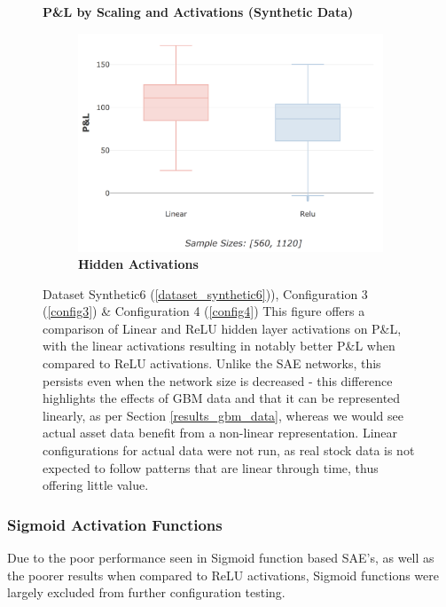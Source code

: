 \documentclass[a4paper,11pt,oneside]{article}
\theoremstyle{plain}
\theoremstyle{definition}
\begin{document}
	\begin{figure}[H]
		\centering
		\textbf{P\&L by Scaling and Activations (Synthetic Data)}

		\begin{subfigure}{.5\textwidth}
			\centering 
			\includegraphics[scale=0.25]{images/results/activations/synth_pl_hidden.png}
			\caption[P\&L by Scaling and Activations (Synthetic Data) - Hidden Activations]{\textbf{Hidden Activations} 
				\newline }
			\label{figure-synth_pl_hidden}
		\end{subfigure}
		\caption[P\&L by Scaling and Activations (Synthetic Data)]
		{Dataset Synthetic6  (\ref{dataset_synthetic6})), Configuration 3 (\ref{config3}) \& Configuration 4 (\ref{config4})
			\newline This figure offers a comparison of Linear and ReLU hidden layer activations on P\&L, with the linear activations resulting in notably better P\&L when compared to ReLU activations. Unlike the SAE networks, this persists even when the network size is decreased - this difference highlights the effects of GBM data and that it can be represented linearly, as per Section \ref{results_gbm_data}, whereas we would see actual asset data benefit from a non-linear representation. Linear configurations for actual data were not run, as real stock data is not expected to follow patterns that are linear through time, thus offering little value.}
		\label{figure-pl_activations_scaling}
	\end{figure}
	
	\subsubsection{Sigmoid Activation Functions} 
	Due to the poor performance seen in Sigmoid function based SAE's, as well as the poorer results when compared to ReLU activations, Sigmoid functions were largely excluded from further configuration testing.
	
\end{document}
